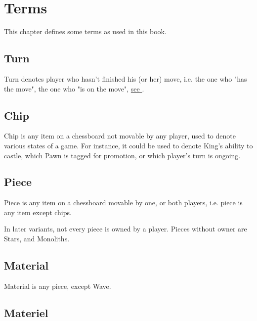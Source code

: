 

\chapter*{Terms}
\label{ch:Terms}

This chapter defines some terms as used in this book.

\section*{Turn}
\label{sec:Terms/Turn}
Turn denotes player who hasn't finished his (or her) move, i.e. the one who
"has the move", the one who "is on the move",
\hyperref[tbl:Appendix/Introduction/Abbreviations]{see }.

\section*{Chip}
\label{sec:Terms/Chip}
Chip is any item on a chessboard not movable by any player, used to denote
various states of a game. For instance, it could be used to denote King's
ability to castle, which Pawn is tagged for promotion, or which player's
turn is ongoing.

\section*{Piece}
\label{sec:Terms/Piece}
Piece is any item on a chessboard movable by one, or both players, i.e. piece
is any item except chips.

In later variants, not every piece is owned by a player. Pieces without owner
are Stars, and Monoliths.

\section*{Material}
\label{sec:Terms/Material}

Material is any piece, except Wave.

\section*{Materiel}
\label{sec:Terms/Materiel}

